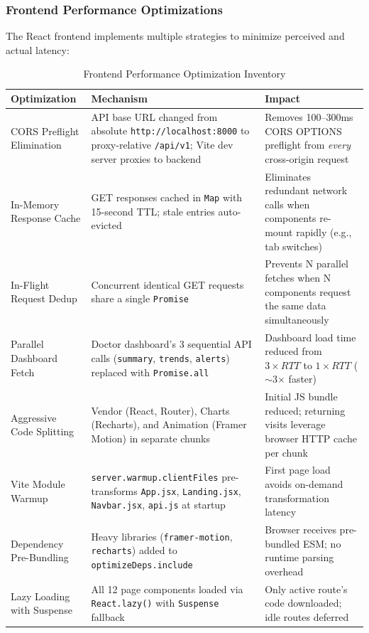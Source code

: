 \documentclass[12pt]{article}
\begin{document}
	\subsubsection{Frontend Performance Optimizations}

	The React frontend implements multiple strategies to minimize perceived and actual latency:

	\begin{table}[H]
		\centering
		\caption{Frontend Performance Optimization Inventory}
		\small
		\begin{tabular}{|p{3.5cm}|p{4cm}|p{4.5cm}|}
			\hline
			\textbf{Optimization} & \textbf{Mechanism} & \textbf{Impact} \\ \hline
			CORS Preflight Elimination & API base URL changed from absolute \texttt{http://localhost:8000} to proxy-relative \texttt{/api/v1}; Vite dev server proxies to backend & Removes 100--300ms CORS OPTIONS preflight from \textit{every} cross-origin request \\ \hline
			In-Memory Response Cache & GET responses cached in \texttt{Map} with 15-second TTL; stale entries auto-evicted & Eliminates redundant network calls when components re-mount rapidly (e.g., tab switches) \\ \hline
			In-Flight Request Dedup & Concurrent identical GET requests share a single \texttt{Promise} & Prevents N parallel fetches when N components request the same data simultaneously \\ \hline
			Parallel Dashboard Fetch & Doctor dashboard's 3 sequential API calls (\texttt{summary}, \texttt{trends}, \texttt{alerts}) replaced with \texttt{Promise.all} & Dashboard load time reduced from $3 \times RTT$ to $1 \times RTT$ ($\sim$3$\times$ faster) \\ \hline
			Aggressive Code Splitting & Vendor (React, Router), Charts (Recharts), and Animation (Framer Motion) in separate chunks & Initial JS bundle reduced; returning visits leverage browser HTTP cache per chunk \\ \hline
			Vite Module Warmup & \texttt{server.warmup.clientFiles} pre-transforms \texttt{App.jsx}, \texttt{Landing.jsx}, \texttt{Navbar.jsx}, \texttt{api.js} at startup & First page load avoids on-demand transformation latency \\ \hline
			Dependency Pre-Bundling & Heavy libraries (\texttt{framer-motion}, \texttt{recharts}) added to \texttt{optimizeDeps.include} & Browser receives pre-bundled ESM; no runtime parsing overhead \\ \hline
			Lazy Loading with Suspense & All 12 page components loaded via \texttt{React.lazy()} with \texttt{Suspense} fallback & Only active route's code downloaded; idle routes deferred \\ \hline
		\end{tabular}
	\end{table}
\end{document}
